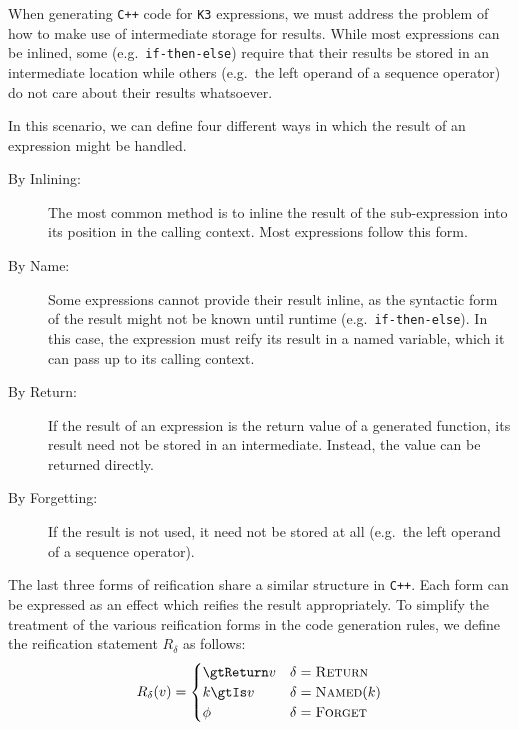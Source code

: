 \documentclass{article}
\begin{document}
    When generating \texttt{C++} code for \texttt{K3} expressions, we must address the problem of
    how to make use of intermediate storage for results. While most expressions can be inlined, some
    (e.g.~\texttt{if-then-else}) require that their results be stored in an intermediate location
    while others (e.g.~the left operand of a sequence operator) do not care about their results
    whatsoever.

    In this scenario, we can define four different ways in which the result of an expression might
    be handled.

    \begin{description}
        \item[By Inlining:] The most common method is to inline the result of the sub-expression
            into its position in the calling context. Most expressions follow this form.
        \item[By Name:] Some expressions cannot provide their result inline, as the syntactic form
            of the result might not be known until runtime (e.g.~\texttt{if-then-else}). In this
            case, the expression must reify its result in a named variable, which it can pass up to
            its calling context.
        \item[By Return:] If the result of an expression is the return value of a generated
            function, its result need not be stored in an intermediate. Instead, the value can be
            returned directly.
        \item[By Forgetting:] If the result is not used, it need not be stored at all (e.g.~the left
            operand of a sequence operator).
    \end{description}

    The last three forms of reification share a similar structure in \texttt{C++}. Each form can be
    expressed as an effect which reifies the result appropriately. To simplify the treatment of the
    various reification forms in the code generation rules, we define the reification statement
    $R_\delta$ as follows:
%
    \begin{align*}
        R_\delta(v) = \begin{cases}
            \gtReturn v & \delta = \textsc{Return} \\
            k \gtIs v & \delta = \textsc{Named$(k)$} \\
            \phi & \delta = \textsc{Forget}
        \end{cases}
    \end{align*}
\end{document}

